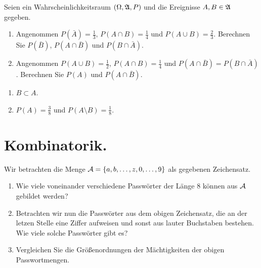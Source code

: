  Seien ein
Wahrscheinlichkeitsraum $\left( \Omega, \mathfrak A, P \right)$ und die Ereignisse $A,
B \in \mathfrak A$ gegeben. 
\begin{enumerate}
    \item Angenommen $P(\bar A)=\frac{1}{3}$, $P(A\cap B)=\frac{1}{4}$ und
        $P(A \cup B)=\frac{2}{3}$. Berechnen Sie $P(\bar B)$, $P(A \cap \bar B)$
        und $P( B \cap \bar A )$.
        
    \item Angenommen $P(A \cup B) = \frac{1}{2}$, $P(A \cap B) = \frac{1}{4}$
        und $P(A \cap \bar B) = P(B \cap \bar A)$. Berechnen Sie $P(A)$ und
        $P(A \cap \bar B)$. 
\end{enumerate}

\solution
\begin{enumerate}
    \item $B \subset A$.

    \item $P(A) = \frac{3}{8}$ und $P(A \setminus B) = \frac{1}{8}$.
\end{enumerate}



\section{Kombinatorik.}


 Wir betrachten die Menge
$\mathcal A = \left\{ a, b, \dots, z, 0, \dots, 9 \right\}$ als gegebenen Zeichensatz.
\begin{enumerate}
    \item Wie viele voneinander verschiedene Passwörter der Länge 8 können
        aus $\mathcal A$ gebildet werden?
    \item Betrachten wir nun die Passwörter aus dem obigen Zeichensatz, die an der
        letzen Stelle eine Ziffer aufweisen und sonst aus lauter Buchstaben bestehen.
        Wie viele solche Passwörter gibt es?
    \item Vergleichen Sie die Größenordnungen der Mächtigkeiten der obigen
        Passwortmengen. 
\end{enumerate}

